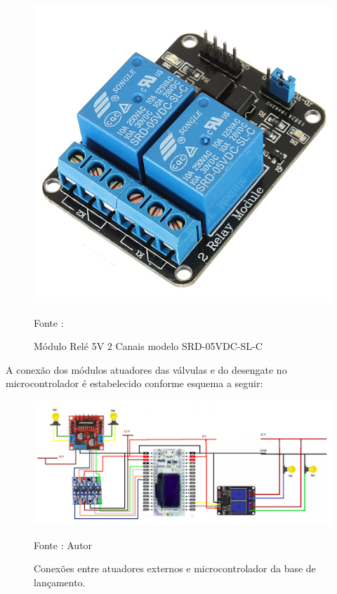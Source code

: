 \begin{figure}[H]
  \centering
  \includegraphics[scale=0.3]{figuras/RELE_2CHANNEL.jpg}
  \caption{ Módulo Relé 5V 2 Canais modelo SRD-05VDC-SL-C} 
  {\footnotesize Fonte : \cite{rele_photo}} 
  \label{fig:RELE_2CHANNEL}
\end{figure}

A conexão dos módulos atuadores das válvulas e do desengate no microcontrolador é estabelecido conforme esquema a seguir:

\begin{figure}[H]
  \centering
  \includegraphics[scale=0.3]{figuras/BASE_VALVULAS.png}
  \caption{ Conexões entre atuadores externos e microcontrolador da base de lançamento. } 
  {\footnotesize Fonte : Autor}
  \label{fig:base_valvulas}
\end{figure}

